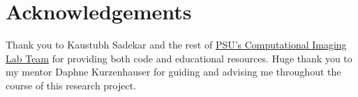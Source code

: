 \documentclass[letterpaper,12pt]{article}
\begin{document}
\section{Acknowledgements}
Thank you to Kaustubh Sadekar and the rest of 
\href{https://www.computational.camera/team}{PSU's Computational Imaging Lab Team} for providing
both code and educational resources. Huge thank you to my mentor Daphne Kurzenhauser for guiding 
and advising me throughout the course of this research project.

\nocite{*}
\printbibliography
\end{document}
